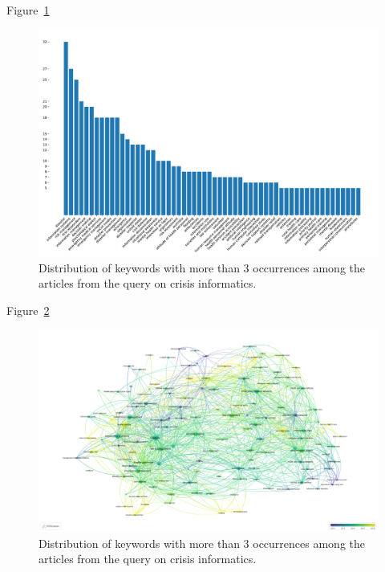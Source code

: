 Figure~\ref{literature:business-needs-bar}

\begin{figure}[bp]
    \centering
    \includegraphics[width=\textwidth]{figures/chap-2/business-needs-bar.pdf}
    \caption{Distribution of keywords with more than 3 occurrences among the articles from the query on crisis informatics. }
    \label{literature:business-needs-bar}
\end{figure}

Figure~\ref{literature:business-needs-overlay}

\begin{figure}[bp]
    \includegraphics[width=\paperwidth,height=\paperheight,keepaspectratio, angle=90]{figures/chap-2/business-needs-overlay.pdf}
    \caption{Distribution of keywords with more than 3 occurrences among the articles from the query on crisis informatics. }
    \label{literature:business-needs-overlay}
\end{figure}

